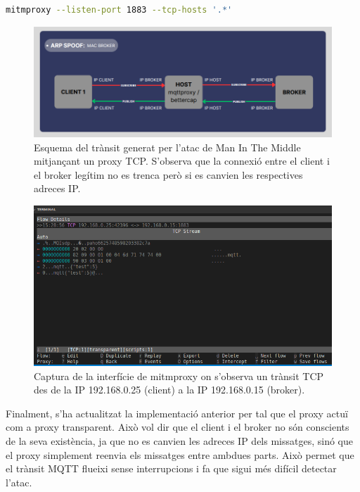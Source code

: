 \begin{lstlisting}[language=bash, caption={Execució Mitmproxy}, label=lst:mitmproxy]
  mitmproxy --listen-port 1883 --tcp-hosts '.*'
  \end{lstlisting}

  \begin{figure}[H]
    \centering
    \includegraphics[width=1\textwidth]{img/mitmproxy.png}
    \caption{Esquema del trànsit generat per l'atac de Man In The Middle mitjançant un proxy TCP. S'observa que la connexió entre el client i el broker legítim no es trenca però si es canvien les respectives adreces IP.}
    \label{fig:MITMproxy}
  \end{figure}

  \begin{figure}[H]
    \centering
    \includegraphics[width=1\textwidth]{img/mitmcapt.png}
    \caption{Captura de la interfície de mitmproxy on s'observa un trànsit TCP des de la IP 192.168.0.25 (client) a la IP 192.168.0.15 (broker).}
    \label{fig:MITMcapt}
  \end{figure}

Finalment, s'ha actualitzat la implementació anterior per tal que el proxy actuï com a proxy transparent. Això vol dir que el client i el broker no són conscients de la seva existència, ja que no es canvien les adreces IP dels missatges, sinó que el proxy simplement reenvia els missatges entre ambdues parts. Això permet que el trànsit MQTT flueixi sense interrupcions i fa que sigui més difícil detectar l'atac.

